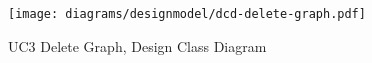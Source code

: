 \begin{figure}[p]%
\end{figure}
\begin{figure}[H]
    \centering
    \texttt{[image: diagrams/designmodel/dcd-delete-graph.pdf]}
    \caption{UC3 Delete Graph, Design Class Diagram}
    \label{fig:delete-graph-dcd}
\end{figure}
\newpage
% 
